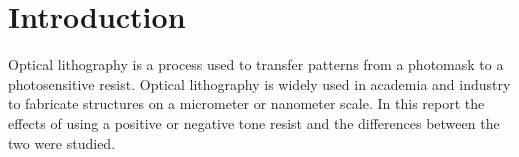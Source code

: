 \section*{Introduction}
Optical lithography is a process used to transfer patterns from a photomask to a photosensitive resist. Optical lithography is widely used in academia and industry to fabricate structures on a micrometer or nanometer scale. In this report the effects of using a positive or negative tone resist and the differences between the two were studied.